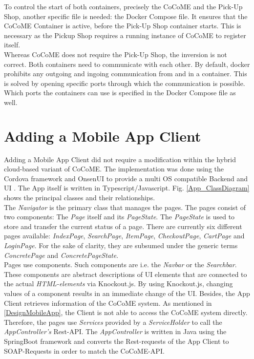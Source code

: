  \noindent
 	To control the start of both containers, precisely the CoCoME and the Pick-Up Shop, another specific file is needed: the Docker Compose file. It ensures that the CoCoME Container is active, before the Pick-Up Shop container starts. This is necessary as the Pickup Shop requires a running instance of CoCoME to register itself.\\
 	Whereas CoCoME does not require the Pick-Up Shop, the inversion is not correct.
 	Both containers need to communicate with each other. By default, docker prohibits any outgoing and ingoing communication from and in a container. This is solved by opening specific ports through which the communication is possible. Which ports the containers can use is specified in the Docker Compose file as well.
 	
 	
 \section{Adding a Mobile App Client}\label{AppImplementation}
Adding a Mobile App Client did not require a modification within the hybrid cloud-based variant of CoCoME. The implementation was done using the Cordova framework and OnsenUI to provide a multi OS compatible Backend and UI \cite{schnabel}. The App itself is written in Typescript/Javascript. Fig. \ref{App_ClassDiagram} shows the principal classes and their relationships.
\\
The \textit{Navigator} is the primary class that manages the pages. The pages consist of two components: The \textit{Page} itself and its \textit{PageState}. The \textit{PageState} is used to store and transfer the current status of a page. There are currently six different pages available: \textit{IndexPage}, \textit{SearchPage}, \textit{ItemPage}, \textit{CheckoutPage}, \textit{CartPage} and \textit{LoginPage}. For the sake of clarity, they are subsumed under the generic terms \textit{ConcretePage} and \textit{ConcretePageState}. 
\\
Pages use components. Such components are i.e. the \textit{Navbar} or the \textit{Searchbar}. These components are abstract descriptions of UI elements that are connected to the actual \textit{HTML-elements} via Knockout.js. By using Knockout.js, changing values of a component results in an immediate change of the UI. 
Besides, the App Client retrieves information of the CoCoME system.  As mentioned in \ref{DesignMobileApp}, the Client is not able to access the CoCoME system directly. Therefore, the pages use \textit{Services} provided by a \textit{ServiceHolder} to call the \textit{AppController's} Rest-API. The \textit{AppController} is written in Java using the SpringBoot framework and converts the Rest-requests of the App Client to SOAP-Requests in order to match the CoCoME-API. 
  
